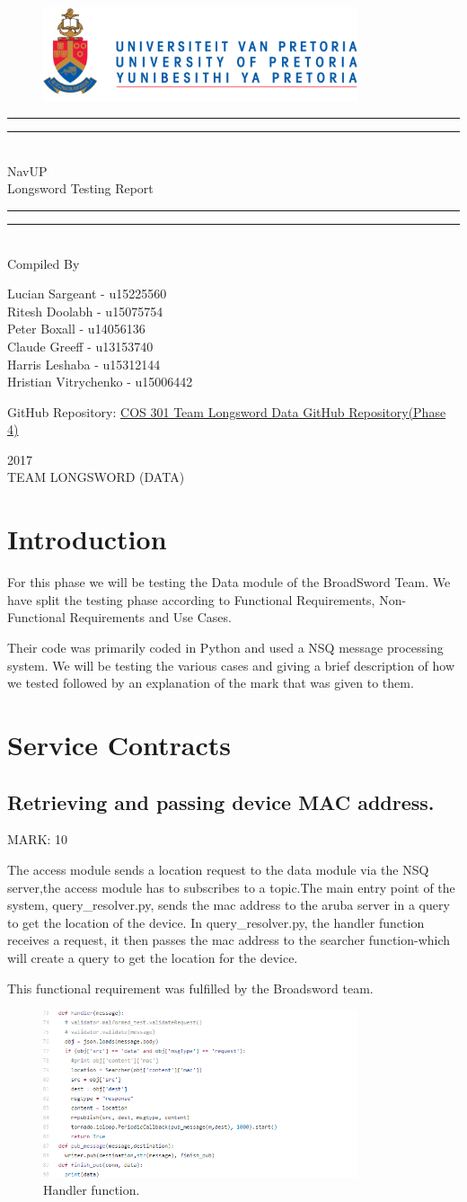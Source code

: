 \documentclass{article}
\newcommand*{\titleGP}{\begingroup
		\begin{figure}[t]
			\centering
			\includegraphics[width=350px]{UP_Logo.PNG}
		\end{figure}
\centering 
\vspace*{\baselineskip}

\rule{\textwidth}{1.6pt}\vspace*{-\baselineskip}\vspace*{2pt}
\rule{\textwidth}{0.4pt}\\[\baselineskip]

{\LARGE NavUP\\ [0.3\baselineskip] Longsword Testing Report } \\ [0.2\baselineskip]
\rule{\textwidth}{0.4pt}\vspace*{-\baselineskip}\vspace{3.2pt}
\rule{\textwidth}{1.6pt}\\[\baselineskip] %



Compiled By \\[\baselineskip]
{\Large Lucian Sargeant - u15225560 \\ Ritesh Doolabh - u15075754 \\ Peter Boxall -  u14056136 \\ Claude Greeff - u13153740\\ Harris Leshaba - u15312144 \\ Hristian Vitrychenko - u15006442\par}

\bigskip
\bigskip

 	GitHub Repository:  
 	\href{https://github.com/Chris19951225/COS-301-Longsword-Data-Streaming}{COS 301 Team Longsword Data GitHub Repository(Phase 4)}




 

\vfill


{\scshape 2017} \\[0.3\baselineskip]
{\large TEAM LONGSWORD (DATA)}\par

\endgroup}
\begin{document}
\titleGP
\newpage
\tableofcontents

\newpage
\section{Introduction}
\begin{flushleft}
For this phase we will be testing the Data module of the BroadSword Team. We have split the testing phase according to Functional Requirements, Non-Functional Requirements and Use Cases. 
\end{flushleft}

\begin{flushleft}
Their code was primarily coded in Python and used a NSQ message processing system.
We will be testing the various cases and giving a brief description of how we tested followed by an explanation of the mark that was given to them.
\end{flushleft}


\section{Service Contracts}


\subsection{Retrieving and passing device MAC address.}
\begin{flushleft}
MARK: 10
\end{flushleft}

\begin{flushleft}
The access module sends a location request to the data module via the NSQ server,the access module has to subscribes to a topic.The main entry point of the system, query\_resolver.py, sends the mac address to the aruba server in a query to get the location of the device.
In query\_resolver.py, the handler function receives a request, it then passes the mac address to the searcher function-which will create a query to get the location for the device.
\end{flushleft}

\begin{flushleft}
This functional requirement was fulfilled by the Broadsword team.
\end{flushleft}
\begin{figure}[ht]
  \includegraphics[width=350px]{Handler.png}

\caption{Handler function.}
  \label{fig:Handler function}
\end{figure}
\end{document}
